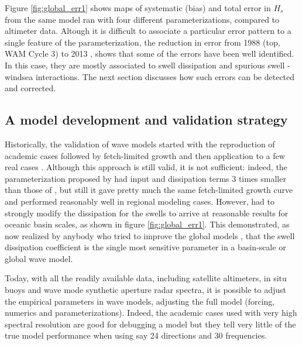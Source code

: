 Figure \ref{fig:global_err1} shows maps of systematic (bias) and total error in $H_s$ from the same model ran with four different parameterizations, compared to altimeter data. 
Altough it is difficult to associate a particular error pattern to a single feature of the parameterization, the reduction in error from 1988 (top, WAM Cycle 3)
to 2013 \citep{Rascle&Ardhuin2013}, shows that some of the errors have been well identified. In this case, they are mostly associated to swell dissipation 
and spurious swell - windsea interactions. The next section discusses how such errors can be detected and corrected. 


\subsection{A model development and validation strategy}
Historically, the validation of wave models started with the reproduction of academic cases 
followed by fetch-limited growth and then application to a few real cases \citep[e.g.][]{WAMDI1988}. Although this approach is still valid, it is not sufficient: indeed, 
the parameterization proposed by \cite{Tolman&Chalikov1996} had input and dissipation terms 3 times smaller than those of \cite{Janssen&al.1994}, but still it gave pretty much 
the same fetch-limited growth curve and performed reasonably well in regional modeling cases. However, \cite{Tolman2002d} had to strongly modify the dissipation for the swells to arrive 
at reasonable results for oceanic basin scales,  as shown in figure \ref{fig:global_err1}. This demonstrated, as now realized by anybody who tried
to improve the global models \citep[e.g.][]{Ardhuin&al.2010,Zieger&al.2015}, that the swell dissipation coefficient is the single most sensitive parameter 
in a basin-scale or global wave model. 

Today, with all the readily available data, including satellite altimeters, in situ buoys and wave mode synthetic aperture radar spectra, it is possible to adjust the empirical 
parameters in wave models, adjusting the full model (forcing, numerics and parameterizations). Indeed, the academic cases used with very high spectral resolution are good for debugging a model 
but they tell very little of the true model performance when using say 24 directions and 30 frequencies. 

